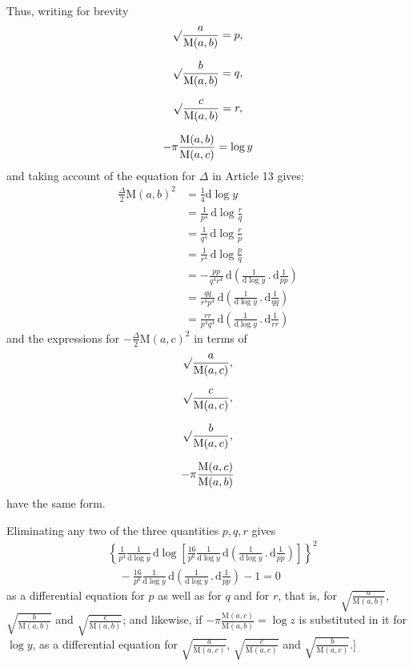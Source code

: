 \par Thus, writing for brevity
\[
\begin{gathered}\surd\frac{a}{\mathrm M(a,b)}=p,\\[7pt]
\surd\frac{b}{\mathrm M(a,b)}=q,\\[7pt]
\surd\frac{c}{\mathrm M(a,b)}=r,\\[7pt]
-\pi\frac{\mathrm M(a,b)}{\mathrm M(a,c)}=\log y\end{gathered}
\]
and taking account of the equation for $\Delta$ in Article 13 gives:
\[
\begin{aligned}
\displaystyle\frac{\Delta}{2}\mathrm M(a,b)^2
&=\displaystyle\frac14\mathrm d\log y\\&=\frac{1}{p^4}\,\mathrm d\log\frac{r}{q}\\&=\frac{1}{q^4}\,\mathrm d\log\frac{r}{p}\\&=\frac{1}{r^4}\,\mathrm d\log\frac{p}{q}\\[8pt]
&=\displaystyle-\frac{pp}{q^4r^4}\,\mathrm d
\left(\frac{1}{\mathrm d\log y}\mathbin{.}\mathrm d\frac{1}{pp}\right)\\&=\frac{qq}{r^4p^4}\,\mathrm d
\left(\frac{1}{\mathrm d\log y}\mathbin{.}\mathrm d\frac{1}{qq}\right)\\&=\frac{rr}{p^4q^4}\,\mathrm d
\left(\frac{1}{\mathrm d\log y}\mathbin{.}\mathrm d\frac{1}{rr}\right)
\end{aligned}
\]
and the expressions for $-\frac{\Delta}{2}\mathrm M(a,c)^2$ in terms of
\[
\begin{gathered}\surd\frac{a}{\mathrm M(a,c)},\\[7pt]
\surd\frac{c}{\mathrm M(a,c)},\\[7pt]
\surd\frac{b}{\mathrm M(a,c)},\\[7pt]
-\pi\frac{\mathrm M(a,c)}{\mathrm M(a,b)}\end{gathered}
\]
have the same form.
\par Eliminating any two of the three quantities $p,q,r$ gives
\[
\begin{aligned}&\left\{\frac{1}{p^4}\frac{1}{\mathrm d\log y}\,\mathrm d\log
\left[\frac{16}{p^6}\frac{1}{\mathrm d\log y}\,\mathrm d
\left(\frac{1}{\mathrm d\log y}\mathbin{.}\mathrm d\frac{1}{pp}\right)\right]\right\}^{2}\\&\quad-\frac{16}{p^6}\frac{1}{\mathrm d\log y}\,\mathrm d
\left(\frac{1}{\mathrm d\log y}\mathbin{.}\mathrm d\frac{1}{pp}\right)-1=0\end{aligned}
\]
%
as a differential equation for $p$ as well as for $q$ and for $r$, that is, for
$\surd{\frac{a}{\mathrm M(a,b)}}$, $\surd{\frac{b}{\mathrm M(a,b)}}$ and
$\surd{\frac{c}{\mathrm M(a,b)}}$; and likewise, if
$-\pi\frac{\mathrm M(a,c)}{\mathrm M(a,b)}=\log z$ is substituted in it for $\log y$,
as a differential equation for $\surd{\frac{a}{\mathrm M(a,c)}}$,
$\surd{\frac{c}{\mathrm M(a,c)}}$ and $\surd{\frac{b}{\mathrm M(a,c)}}$.]

